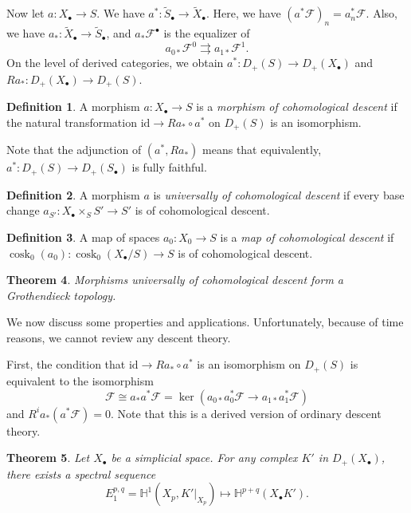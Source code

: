 \documentclass[leqno, openany]{memoir}
\newtheorem{thm}{Theorem}[section]
\theoremstyle{definition}
\newtheorem{defn}[thm]{Definition}
\theoremstyle{remark}
\theoremstyle{plain}
\theoremstyle{definition}
\theoremstyle{remark}
\newcommand{\mc}[1]{\mathcal{#1}}
\newcommand{\mr}[1]{\mathrm{#1}}
\newcommand{\on}[1]{\operatorname{#1}}
\newcommand{\wt}[1]{\widetilde{#1}}
\begin{document}
Now let $a \colon X_{\bullet} \to S$. We have $a^* \colon \wt{S}_{\bullet} \to \wt{X}_{\bullet}$. Here, we have $(a^* \mc{F})_n = a_n^* \mc{F}$. Also, we have $a_* \colon \wt{X}_{\bullet} \to \wt{S}_{\bullet}$, and $a_* \mc{F}^{\bullet}$ is the equalizer of
\[ a_{0*} \mc{F}^0 \rightrightarrows a_{1*} \mc{F}^1. \]
On the level of derived categories, we obtain $a^* \colon D_+(S) \to D_+(X_{\bullet})$ and $Ra_* \colon D_+(X_{\bullet}) \to D_+(S)$.

\begin{defn}
    A morphism $a \colon X_{\bullet} \to S$ is a \textit{morphism of cohomological descent} if the natural transformation $\mr{id} \to Ra_* \circ a^*$ on $D_+(S)$ is an isomorphism.
\end{defn}
Note that the adjunction of $(a^*, Ra_*)$ means that equivalently, $a^* \colon D_+(S) \to D_+(S_{\bullet})$ is fully faithful.

\begin{defn}
    A morphism $a$ is \textit{universally of cohomological descent} if every base change $a_{S'} \colon X_{\bullet} \times_S S' \to S'$ is of cohomological descent.
\end{defn}

\begin{defn}
    A map of spaces $a_0 \colon X_0 \to S$ is a \textit{map of cohomological descent} if $\on{cosk}_0(a_0) \colon \on{cosk}_0(X_{\bullet}/S) \to S$ is of cohomological descent.
\end{defn}

\begin{thm}
    Morphisms universally of cohomological descent form a Grothendieck topology.
\end{thm}

We now discuss some properties and applications. Unfortunately, because of time reasons, we cannot review any descent theory.

First, the condition that $\mr{id} \to Ra_* \circ a^*$ is an isomorphism on $D_+(S)$ is equivalent to the isomorphism
\[ \mc{F} \cong a_* a^* \mc{F} = \ker(a_{0*} a_0^* \mc{F} \to a_{1*} a_1^* \mc{F}) \]
and $R^i a_*(a^* \mc{F}) = 0$. Note that this is a derived version of ordinary descent theory.

\begin{thm}
    Let $X_{\bullet}$ be a simplicial space. For any complex $K'$ in $D_+(X_{\bullet})$, there exists a spectral sequence
    \[ E_1^{p,q} = \mathbb{H}^1(X_p, K'|_{X_p}) \mapsto \mathbb{H}^{p+q}(X_{\bullet} K'). \]
\end{thm}
\end{document}
